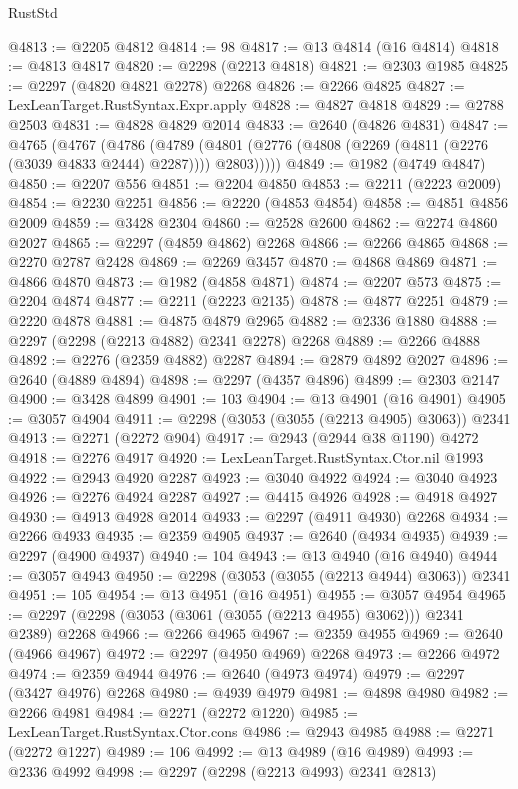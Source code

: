 \begin{lexlean}{RustStd}
\begin{coremodule}
@4813 := @2205 @4812
@4814 := 98
@4817 := @13 @4814 (@16 @4814)
@4818 := @4813 @4817
@4820 := @2298 (@2213 @4818)
@4821 := @2303 @1985
@4825 := @2297 (@4820 @4821 @2278) @2268
@4826 := @2266 @4825
@4827 := LexLeanTarget.RustSyntax.Expr.apply
@4828 := @4827 @4818
@4829 := @2788 @2503
@4831 := @4828 @4829 @2014
@4833 := @2640 (@4826 @4831)
@4847 := @4765
    (@4767
      (@4786
        (@4789 (@4801 (@2776 (@4808 (@2269 (@4811 (@2276 (@3039 @4833 @2444) @2287)))) @2803)))))
@4849 := @1982 (@4749 @4847)
@4850 := @2207 @556
@4851 := @2204 @4850
@4853 := @2211 (@2223 @2009)
@4854 := @2230 @2251
@4856 := @2220 (@4853 @4854)
@4858 := @4851 @4856 @2009
@4859 := @3428 @2304
@4860 := @2528 @2600
@4862 := @2274 @4860 @2027
@4865 := @2297 (@4859 @4862) @2268
@4866 := @2266 @4865
@4868 := @2270 @2787 @2428
@4869 := @2269 @3457
@4870 := @4868 @4869
@4871 := @4866 @4870
@4873 := @1982 (@4858 @4871)
@4874 := @2207 @573
@4875 := @2204 @4874
@4877 := @2211 (@2223 @2135)
@4878 := @4877 @2251
@4879 := @2220 @4878
@4881 := @4875 @4879 @2965
@4882 := @2336 @1880
@4888 := @2297 (@2298 (@2213 @4882) @2341 @2278) @2268
@4889 := @2266 @4888
@4892 := @2276 (@2359 @4882) @2287
@4894 := @2879 @4892 @2027
@4896 := @2640 (@4889 @4894)
@4898 := @2297 (@4357 @4896)
@4899 := @2303 @2147
@4900 := @3428 @4899
@4901 := 103
@4904 := @13 @4901 (@16 @4901)
@4905 := @3057 @4904
@4911 := @2298 (@3053 (@3055 (@2213 @4905) @3063)) @2341
@4913 := @2271 (@2272 @904)
@4917 := @2943 (@2944 @38 @1190) @4272
@4918 := @2276 @4917
@4920 := LexLeanTarget.RustSyntax.Ctor.nil @1993
@4922 := @2943 @4920 @2287
@4923 := @3040 @4922
@4924 := @3040 @4923
@4926 := @2276 @4924 @2287
@4927 := @4415 @4926
@4928 := @4918 @4927
@4930 := @4913 @4928 @2014
@4933 := @2297 (@4911 @4930) @2268
@4934 := @2266 @4933
@4935 := @2359 @4905
@4937 := @2640 (@4934 @4935)
@4939 := @2297 (@4900 @4937)
@4940 := 104
@4943 := @13 @4940 (@16 @4940)
@4944 := @3057 @4943
@4950 := @2298 (@3053 (@3055 (@2213 @4944) @3063)) @2341
@4951 := 105
@4954 := @13 @4951 (@16 @4951)
@4955 := @3057 @4954
@4965 := @2297 (@2298 (@3053 (@3061 (@3055 (@2213 @4955) @3062))) @2341 @2389) @2268
@4966 := @2266 @4965
@4967 := @2359 @4955
@4969 := @2640 (@4966 @4967)
@4972 := @2297 (@4950 @4969) @2268
@4973 := @2266 @4972
@4974 := @2359 @4944
@4976 := @2640 (@4973 @4974)
@4979 := @2297 (@3427 @4976) @2268
@4980 := @4939 @4979
@4981 := @4898 @4980
@4982 := @2266 @4981
@4984 := @2271 (@2272 @1220)
@4985 := LexLeanTarget.RustSyntax.Ctor.cons
@4986 := @2943 @4985
@4988 := @2271 (@2272 @1227)
@4989 := 106
@4992 := @13 @4989 (@16 @4989)
@4993 := @2336 @4992
@4998 := @2297 (@2298 (@2213 @4993) @2341 @2813)

\end{coremodule}
\end{lexlean}
